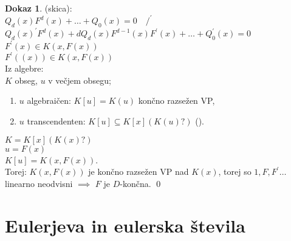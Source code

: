 \documentclass[a4paper, 12pt]{book}
\theoremstyle{definition}
\newtheorem{pro}[counter]{Dokaz}
\theoremstyle{remark}
\begin{document}
\begin{pro} (skica): \\
  $Q_d(x) F^d(x) + \dots + Q_0(x) = 0 \quad /^{'}$ \\
  $Q_d(x)^{'} F^d(x) + d Q_d(x) F^{d-1}(x) F^{'}(x) + \dots + Q_0^{'}(x) = 0$ \\
  $F^{'}(x) \in K(x, F(x))$ \\
  $F^{'}((x)) \in K(x, F(x))$ \\
  Iz algebre: \\
  $K$ obseg, $u$ v večjem obsegu;
  \begin{enumerate}[label={(\roman*)}]
    \item $u$ algebraičen: $K[u] = K(u)$ končno razsežen VP,
    \item $u$ transcendenten: $K[u] \subseteq K[x](K(u)?)$ ().
  \end{enumerate}
  $K = K[x](K(x)?)$ \\
  $u = F(x)$ \\
  $K[u] = K(x, F(x))$. \\
  Torej: $K(x, F(x))$ je končno razsežen VP nad $K(x)$, torej so $1, F, F^{'} \dots$ linearno neodvisni
  $\implies$ $F$ je $D$-končna.
  \qed
\end{pro}


\section{Eulerjeva in eulerska števila}
\end{document}
